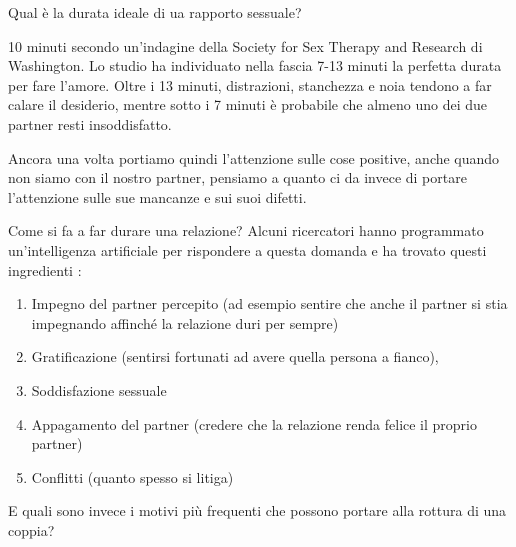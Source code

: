 \documentclass[12pt]{book} %
\begin{document}
\begin{mdframed}[linewidth=1pt]
Qual è la durata ideale di ua rapporto sessuale?

10 minuti secondo un'indagine della Society for Sex Therapy and Research di Washington. Lo studio ha individuato nella
fascia 7-13 minuti la perfetta durata per fare l'amore. Oltre i 13 minuti, distrazioni, stanchezza e noia tendono a far
calare il desiderio, mentre sotto i 7 minuti è probabile che almeno uno dei due partner resti insoddisfatto.
\end{mdframed}

Ancora una volta portiamo quindi l'attenzione sulle cose positive, anche quando non siamo con il
nostro partner, pensiamo a quanto ci da invece di portare l'attenzione sulle sue mancanze e sui
suoi difetti. 

Come si fa a far durare una relazione? Alcuni ricercatori hanno programmato un'intelligenza
artificiale per rispondere a questa domanda e ha trovato questi
ingredienti
:

\begin{enumerate}
\item Impegno del partner percepito (ad esempio sentire che anche il partner si stia impegnando affinché la relazione
duri per sempre)
\item Gratificazione (sentirsi fortunati ad avere quella persona a fianco), 
\item Soddisfazione sessuale
\item Appagamento del partner (credere che la relazione renda felice il proprio partner) 
\item Conflitti (quanto spesso si litiga)
\end{enumerate}
E quali sono invece i motivi più frequenti che possono portare alla rottura di una coppia?
\end{document}
